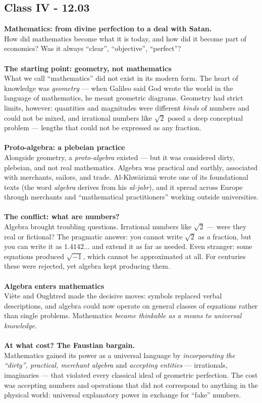 \documentclass[a4paper,12pt]{article}
\begin{document}
\subsection*{Class IV - 12.03}
\noindent \textbf{Mathematics: from divine perfection to a deal with Satan.} \\
\noindent How did mathematics become what it is today, and how did it become part of economics? Was it always ``clear'', ``objective'', ``perfect''? \\
\\
\noindent \textbf{The starting point: geometry, not mathematics} \\
\noindent What we call ``mathematics'' did not exist in its modern form. The heart of knowledge was \emph{geometry} --- when Galileo said God wrote the world in the language of mathematics, he meant geometric diagrams. Geometry had strict limits, however: quantities and magnitudes were different \emph{kinds} of numbers and could not be mixed, and irrational numbers like $\sqrt{2}$ posed a deep conceptual problem --- lengths that could not be expressed as any fraction. \\
\\
\noindent \textbf{Proto-algebra: a plebeian practice} \\
\noindent Alongside geometry, a \emph{proto-algebra} existed --- but it was considered dirty, plebeian, and not real mathematics. Algebra was practical and earthly, associated with merchants, sailors, and trade. Al-Khw\=arizm\=\i{} wrote one of its foundational texts (the word \emph{algebra} derives from his \textit{al-jabr}), and it spread across Europe through merchants and ``mathematical practitioners'' working outside universities. \\
\\
\noindent \textbf{The conflict: what are numbers?} \\
\noindent Algebra brought troubling questions. Irrational numbers like $\sqrt{2}$ --- were they real or fictional? The pragmatic answer: you cannot write $\sqrt{2}$ as a fraction, but you can write it as $1.4142\ldots$ and extend it as far as needed. Even stranger: some equations produced $\sqrt{-1}$, which cannot be approximated at all. For centuries these were rejected, yet algebra kept producing them. \\
\\
\noindent \textbf{Algebra enters mathematics} \\
\noindent Vi\`ete and Oughtred made the decisive moves: symbols replaced verbal descriptions, and algebra could now operate on general classes of equations rather than single problems. Mathematics \emph{became thinkable as a means to universal knowledge}. \\
\\
\noindent \textbf{At what cost? The Faustian bargain.} \\
\noindent Mathematics gained its power as a universal language by \emph{incorporating the ``dirty'', practical, merchant algebra} and \emph{accepting entities} --- irrationals, imaginaries --- that violated every classical ideal of geometric perfection. The cost was accepting numbers and operations that did not correspond to anything in the physical world: universal explanatory power in exchange for ``fake'' numbers.
\end{document}
